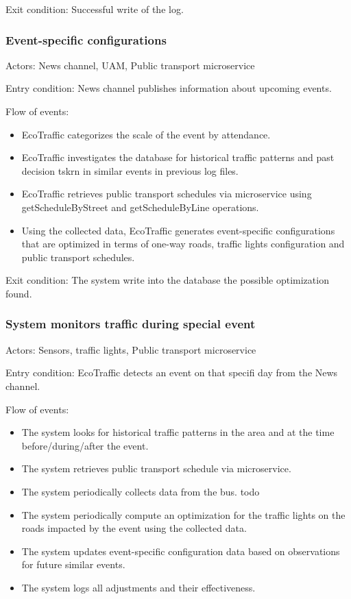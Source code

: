 \documentclass[12pt, a4paper, twoside, openright]{report}
\begin{document}
Exit condition: Successful write of the log.


\subsubsection{Event-specific configurations}


Actors: News channel, UAM, Public transport microservice

Entry condition: News channel publishes information about upcoming
events.

Flow of events:

\begin{itemize}
\item
  EcoTraffic categorizes the scale of the event by attendance.
\item
  EcoTraffic investigates the database for historical traffic patterns
  and past decision tskrn in similar events in previous log files.
\item
  EcoTraffic retrieves public transport schedules via microservice using
  getScheduleByStreet and getScheduleByLine operations.
\item
  Using the collected data, EcoTraffic generates event-specific
  configurations that are optimized in terms of one-way roads, traffic
  lights configuration and public transport schedules.
\end{itemize}

Exit condition: The system write into the database the possible
optimization found.


\subsubsection{System monitors traffic during special event}


Actors: Sensors, traffic lights, Public transport microservice

Entry condition: EcoTraffic detects an event on that specifi day from
the News channel.

Flow of events:

\begin{itemize}
\item
  The system looks for historical traffic patterns in the area and at
  the time before/during/after the event.
\item
  The system retrieves public transport schedule via microservice.
\item
  The system periodically collects data from the bus. todo
\item
  The system periodically compute an optimization for the traffic lights
  on the roads impacted by the event using the collected data.
\item
  The system updates event-specific configuration data based on
  observations for future similar events.
\item
  The system logs all adjustments and their effectiveness.
\end{itemize}
\end{document}
